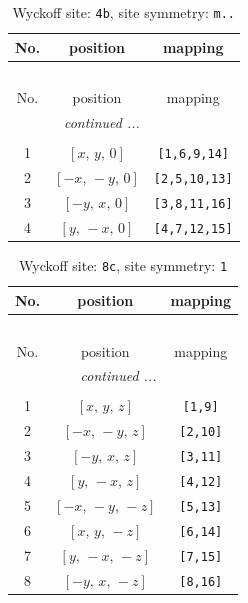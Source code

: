 \documentclass[fleqn,8pt]{jsarticle}
\begin{document}
\begin{longtable}{ccc}
\caption{Wyckoff site: {\tt 4b}, site symmetry: {\tt m..}}
 \\
 \hline \hline
No. & position & mapping \\ \hline \endfirsthead

\multicolumn{2}{l}{\tablename\ \thetable{}} \\
 \hline \hline
No. & position & mapping \\ \hline \endhead

 \hline \hline
\multicolumn{2}{r}{\footnotesize\it continued ...} \\ \endfoot

 \hline \hline
\multicolumn{2}{r}{} \\ \endlastfoot

1 & $\left[ x,\, y,\, 0 \right]$ & {\tt [1,6,9,14]} \\ \hline
2 & $\left[ - x,\, - y,\, 0 \right]$ & {\tt [2,5,10,13]} \\ \hline
3 & $\left[ - y,\, x,\, 0 \right]$ & {\tt [3,8,11,16]} \\ \hline
4 & $\left[ y,\, - x,\, 0 \right]$ & {\tt [4,7,12,15]} \\
\end{longtable}
\renewcommand{\arraystretch}{1.2}
\begin{longtable}{ccc}
\caption{Wyckoff site: {\tt 8c}, site symmetry: {\tt 1}}
 \\
 \hline \hline
No. & position & mapping \\ \hline \endfirsthead

\multicolumn{2}{l}{\tablename\ \thetable{}} \\
 \hline \hline
No. & position & mapping \\ \hline \endhead

 \hline \hline
\multicolumn{2}{r}{\footnotesize\it continued ...} \\ \endfoot

 \hline \hline
\multicolumn{2}{r}{} \\ \endlastfoot

1 & $\left[ x,\, y,\, z \right]$ & {\tt [1,9]} \\ \hline
2 & $\left[ - x,\, - y,\, z \right]$ & {\tt [2,10]} \\ \hline
3 & $\left[ - y,\, x,\, z \right]$ & {\tt [3,11]} \\ \hline
4 & $\left[ y,\, - x,\, z \right]$ & {\tt [4,12]} \\ \hline
5 & $\left[ - x,\, - y,\, - z \right]$ & {\tt [5,13]} \\ \hline
6 & $\left[ x,\, y,\, - z \right]$ & {\tt [6,14]} \\ \hline
7 & $\left[ y,\, - x,\, - z \right]$ & {\tt [7,15]} \\ \hline
8 & $\left[ - y,\, x,\, - z \right]$ & {\tt [8,16]} \\
\end{longtable}
\end{document}
